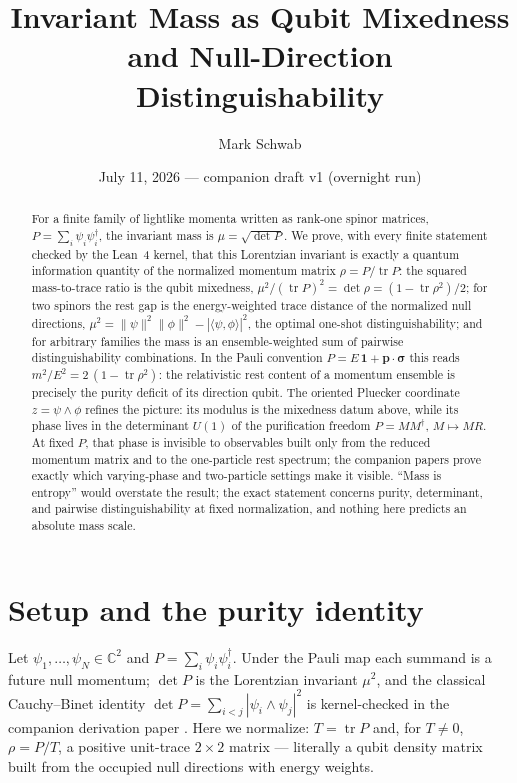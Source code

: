 \documentclass[11pt]{article}
\title{Invariant Mass as Qubit Mixedness and Null-Direction
Distinguishability}
\author{Mark Schwab}
\date{July 11, 2026 --- companion draft v1 (overnight run)}
\newcommand{\id}{\mathbf{1}}
\newcommand{\C}{\mathbb{C}}
\newcommand{\tr}{\operatorname{tr}}
\begin{document}
\maketitle

\begin{abstract}
For a finite family of lightlike momenta written as rank-one spinor
matrices, $P=\sum_i\psi_i\psi_i^\dagger$, the invariant mass is
$\mu=\sqrt{\det P}$.  We prove, with every finite statement checked by the
Lean~4 kernel, that this Lorentzian invariant is exactly a quantum
information quantity of the normalized momentum matrix $\rho=P/\tr P$: the
squared mass-to-trace ratio is the qubit mixedness,
$\mu^2/(\tr P)^2=\det\rho=(1-\tr\rho^2)/2$; for two spinors the rest gap is
the energy-weighted trace distance of the normalized null directions,
$\mu^2=\|\psi\|^2\|\phi\|^2-|\langle\psi,\phi\rangle|^2$, the optimal
one-shot distinguishability; and for arbitrary families the mass is an
ensemble-weighted sum of pairwise distinguishability combinations.  In the
Pauli convention $P=E\,\id+\mathbf p\cdot\boldsymbol\sigma$ this reads
$m^2/E^2=2\,(1-\tr\rho^2)$: the relativistic rest content of a momentum
ensemble is precisely the purity deficit of its direction qubit.  The
oriented Pluecker coordinate $z=\psi\wedge\phi$ refines the picture: its
modulus is the mixedness datum above, while its phase lives in the
determinant $U(1)$ of the purification freedom $P=MM^\dagger$,
$M\mapsto MR$.  At fixed $P$, that phase is invisible to observables built
only from the reduced momentum matrix and to the one-particle rest spectrum;
the companion papers prove exactly which varying-phase and
two-particle settings make it visible.  ``Mass is entropy'' would overstate
the result; the exact statement concerns purity, determinant, and pairwise
distinguishability at fixed normalization, and nothing here predicts an
absolute mass scale.
\end{abstract}

\section{Setup and the purity identity}

Let $\psi_1,\dots,\psi_N\in\C^2$ and $P=\sum_i\psi_i\psi_i^\dagger$.  Under
the Pauli map each summand is a future null momentum; $\det P$ is the
Lorentzian invariant $\mu^2$, and the classical Cauchy--Binet identity
$\det P=\sum_{i<j}|\psi_i\wedge\psi_j|^2$ is kernel-checked in the
companion derivation paper \cite{CompanionDerivation}.  Here we normalize:
$T=\tr P$ and, for $T\neq0$, $\rho=P/T$, a positive unit-trace $2\times2$
matrix --- literally a qubit density matrix built from the occupied null
directions with energy weights.
\end{document}
